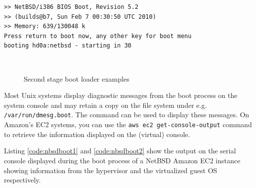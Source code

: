 \newsavebox{\nbsdboot}
\begin{lrbox}{\nbsdboot}
\begin{minipage}{.7\textwidth}
\begin{lstlisting}[basicstyle=\scriptsize]
>> NetBSD/i386 BIOS Boot, Revision 5.2
>> (builds@b7, Sun Feb 7 00:30:50 UTC 2010)
>> Memory: 639/130048 k
Press return to boot now, any other key for boot menu
booting hd0a:netbsd - starting in 30
\end{lstlisting}
\end{minipage}
\end{lrbox}

\begin{figure}[t]
	\centering
	\\
	\caption{Second stage boot loader examples}
\end{figure}

Most Unix systems display diagnostic messages from the
boot process on the system console and
may retain a copy on the file system under e.g. {\tt
/var/run/dmesg.boot}.  The 
command can be used to display these messages.  On
Amazon's EC2 systems, you can use the {\tt aws ec2
get-console-output} command to retrieve the
information displayed on the (virtual) console.

Listing \ref{code:nbsdboot1} and \ref{code:nbsdboot2}
show the output on the serial console displayed during
the boot process of a NetBSD Amazon EC2
instance showing information from the hypervisor and
the virtualized guest OS respectively.

